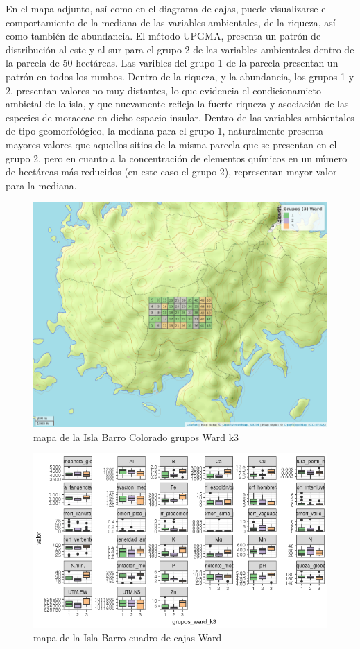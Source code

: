 \documentclass[11pt,]{article}
\begin{document}
En el mapa adjunto, así como en el diagrama de cajas, puede visualizarse
el comportamiento de la mediana de las variables ambientales, de la
riqueza, así como también de abundancia. El método UPGMA, presenta un
patrón de distribución al este y al sur para el grupo 2 de las variables
ambientales dentro de la parcela de 50 hectáreas. Las varibles del grupo
1 de la parcela presentan un patrón en todos los rumbos. Dentro de la
riqueza, y la abundancia, los grupos 1 y 2, presentan valores no muy
distantes, lo que evidencia el condicionamieto ambietal de la isla, y
que nuevamente refleja la fuerte riqueza y asociación de las especies de
moraceae en dicho espacio insular. Dentro de las variables ambientales
de tipo geomorfológico, la mediana para el grupo 1, naturalmente
presenta mayores valores que aquellos sitios de la misma parcela que se
presentan en el grupo 2, pero en cuanto a la concentración de elementos
químicos en un número de hectáreas más reducidos (en este caso el grupo
2), representan mayor valor para la mediana.

\begin{figure}
\centering
\includegraphics[width=1.00000\textwidth]{mapa_ward_k3.png}
\caption{mapa de la Isla Barro Colorado grupos Ward k3
\label{fig:bci_map}}
\end{figure}

\begin{figure}
\centering
\includegraphics[width=1.00000\textwidth]{cuadro_cajas_ward.png}
\caption{mapa de la Isla Barro cuadro de cajas Ward \label{fig:bci_map}}
\end{figure}
\end{document}
